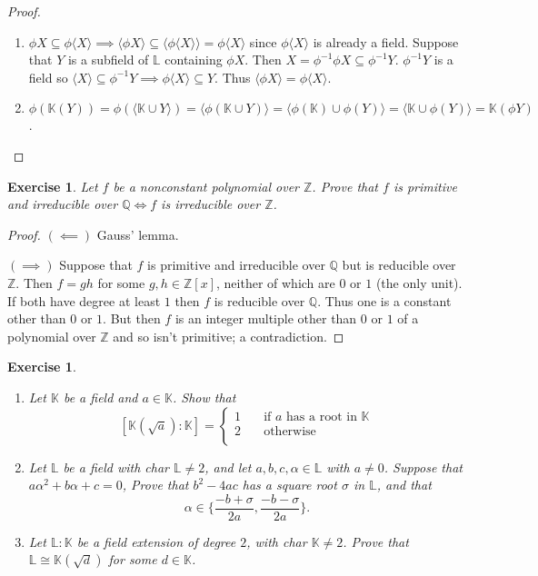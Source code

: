 \documentclass{article}
\newtheorem{exercise}[theorem]{Exercise}
\begin{document}
\begin{proof}
\begin{enumerate}[label=(\roman*)]
    \item $\phi X\subseteq \phi\langle X\rangle\implies \langle\phi X\rangle\subseteq\langle\phi\langle X\rangle\rangle=\phi\langle X\rangle$ since $\phi\langle X\rangle$ is already a field. Suppose that $Y$ is a subfield of $\mathbb{L}$ containing $\phi X$. Then $X=\phi^{-1}\phi X\subseteq\phi^{-1}Y$. $\phi^{-1}Y$ is a field so $\langle X\rangle\subseteq\phi^{-1}Y\implies \phi\langle X\rangle\subseteq Y$. Thus $\langle\phi X\rangle=\phi\langle X\rangle$.
    \item $\phi(\mathbb{K}(Y))=\phi(\langle\mathbb{K}\cup Y\rangle)=\langle\phi(\mathbb{K}\cup Y)\rangle=\langle\phi(\mathbb{K})\cup\phi(Y)\rangle=\langle\mathbb{K}\cup\phi(Y)\rangle=\mathbb{K}(\phi Y)$.
\end{enumerate}
\end{proof}

\begin{exercise}
Let $f$ be a nonconstant polynomial over $\mathbb{Z}$. Prove that $f$ is primitive and irreducible over $\mathbb{Q}\iff f$ is irreducible over $\mathbb{Z}$.
\end{exercise}
\begin{proof}
$(\impliedby)$ Gauss' lemma.

$(\implies)$ Suppose that $f$ is primitive and irreducible over $\mathbb{Q}$ but is reducible over $\mathbb{Z}$. Then $f=gh$ for some $g,h\in\mathbb{Z}[x]$, neither of which are $0$ or $1$ (the only unit). If both have degree at least $1$ then $f$ is reducible over $\mathbb{Q}$. Thus one is a constant other than $0$ or $1$. But then $f$ is an integer multiple other than $0$ or $1$ of a polynomial over $\mathbb{Z}$ and so isn't primitive; a contradiction.
\end{proof}

\begin{exercise}
\begin{enumerate}[label=(\roman*)]
    \item Let $\mathbb{K}$ be a field and $a\in\mathbb{K}$. Show that\[[\mathbb{K}(\sqrt{a}):\mathbb{K}] =\begin{cases}
       1 &\quad\text{if }a\text{ has a root in }\mathbb{K} \\
       2 &\quad\text{otherwise} \\ 
     \end{cases}\]
     \item Let $\mathbb{L}$ be a field with char $\mathbb{L}\neq2$, and let $a,b,c,\alpha\in\mathbb{L}$ with $a\neq0$. Suppose that $a\alpha^2+b\alpha+c=0$, Prove that $b^2-4ac$ has a square root $\sigma$ in $\mathbb{L}$, and that\[\alpha\in\{\frac{-b+\sigma}{2a},\frac{-b-\sigma}{2a}\}.\]
     \item Let $\mathbb{L}:\mathbb{K}$ be a field extension of degree $2$, with char $\mathbb{K}\neq 2$. Prove that $\mathbb{L}\cong\mathbb{K}(\sqrt{d})$ for some $d\in\mathbb{K}$.
\end{enumerate}
\end{exercise}
\end{document}
